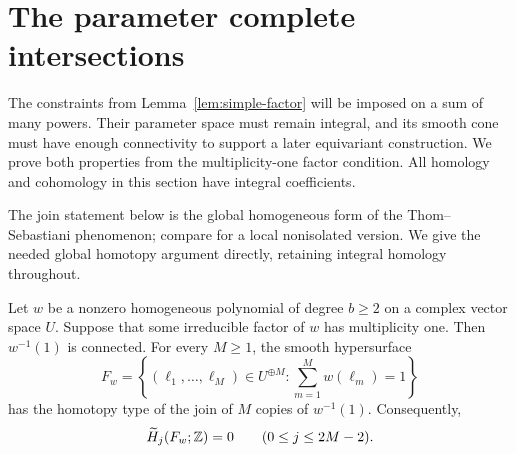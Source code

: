 \section{The parameter complete intersections}
\label{sec:parameters}

The constraints from Lemma~\ref{lem:simple-factor} will be imposed on a
sum of many powers.  Their parameter space must remain integral, and its
smooth cone must have enough connectivity to support a later equivariant
construction.  We prove both properties from the multiplicity-one factor
condition.  All homology and cohomology in this section have integral
coefficients.

The join statement below is the global homogeneous form of the
Thom--Sebastiani phenomenon; compare
\cite[Proposition~4.1 and Appendix]{OhmotoYokura} for a local
nonisolated version. We give the needed global homotopy argument
directly, retaining integral homology throughout.

\begin{lemma}
\label{lem:homogeneous-joins}
Let \(w\) be a nonzero homogeneous polynomial of degree \(b\ge2\) on a
complex vector space \(U\).  Suppose that some irreducible factor of \(w\)
has multiplicity one.  Then \(w^{-1}(1)\) is connected.  For every
\(M\ge1\), the smooth hypersurface
\[
 F_w=\left\{(\ell_1,\ldots,\ell_M)\in U^{\oplus M}:
                 \sum_{m=1}^M w(\ell_m)=1\right\}
\]
has the homotopy type of the join of \(M\) copies of \(w^{-1}(1)\).
Consequently,
\[
 \widetilde H_j(F_w;\mathbb Z)=0\qquad(0\le j\le2M-2).
\]
\end{lemma}

